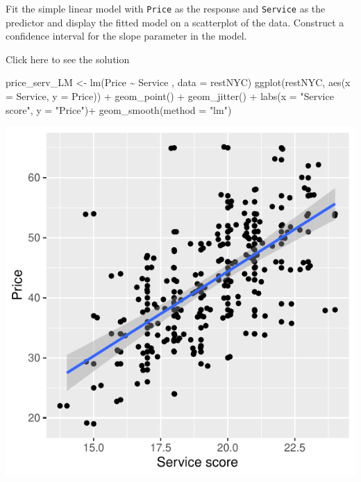 \documentclass[
  letterpaper,
  DIV=11,
  numbers=noendperiod]{scrartcl}
\newenvironment{Shaded}{\begin{snugshade}}{\end{snugshade}}
\newcommand{\AttributeTok}[1]{\textcolor[rgb]{0.40,0.45,0.13}{#1}}
\newcommand{\FunctionTok}[1]{\textcolor[rgb]{0.28,0.35,0.67}{#1}}
\newcommand{\NormalTok}[1]{\textcolor[rgb]{0.00,0.23,0.31}{#1}}
\newcommand{\OtherTok}[1]{\textcolor[rgb]{0.00,0.23,0.31}{#1}}
\newcommand{\SpecialCharTok}[1]{\textcolor[rgb]{0.37,0.37,0.37}{#1}}
\newcommand{\StringTok}[1]{\textcolor[rgb]{0.13,0.47,0.30}{#1}}
\begin{document}
\begin{tcolorbox}[enhanced jigsaw, toprule=.15mm, breakable, bottomtitle=1mm, coltitle=black, colback=white, arc=.35mm, left=2mm, leftrule=.75mm, opacitybacktitle=0.6, colframe=quarto-callout-warning-color-frame, colbacktitle=quarto-callout-warning-color!10!white, toptitle=1mm, titlerule=0mm, opacityback=0, title={Task 7}, rightrule=.15mm, bottomrule=.15mm]

Fit the simple linear model with \texttt{Price} as the response and
\texttt{Service} as the predictor and display the fitted model on a
scatterplot of the data. Construct a confidence interval for the slope
parameter in the model.

Click here to see the solution

\begin{Shaded}
\begin{Highlighting}[]
\NormalTok{price\_serv\_LM }\OtherTok{\textless{}{-}} \FunctionTok{lm}\NormalTok{(Price  }\SpecialCharTok{\textasciitilde{}}\NormalTok{ Service  , }\AttributeTok{data =}\NormalTok{ restNYC)}
\FunctionTok{ggplot}\NormalTok{(restNYC, }\FunctionTok{aes}\NormalTok{(}\AttributeTok{x =}\NormalTok{ Service, }\AttributeTok{y =}\NormalTok{ Price)) }\SpecialCharTok{+}
  \FunctionTok{geom\_point}\NormalTok{() }\SpecialCharTok{+}
  \FunctionTok{geom\_jitter}\NormalTok{() }\SpecialCharTok{+}
  \FunctionTok{labs}\NormalTok{(}\AttributeTok{x =} \StringTok{"Service score"}\NormalTok{, }\AttributeTok{y =} \StringTok{"Price"}\NormalTok{)}\SpecialCharTok{+}
  \FunctionTok{geom\_smooth}\NormalTok{(}\AttributeTok{method =} \StringTok{"lm"}\NormalTok{)}
\end{Highlighting}
\end{Shaded}

\begin{center}
\includegraphics{about_files/figure-pdf/unnamed-chunk-10-1.pdf}
\end{center}


\end{tcolorbox}
\end{document}
